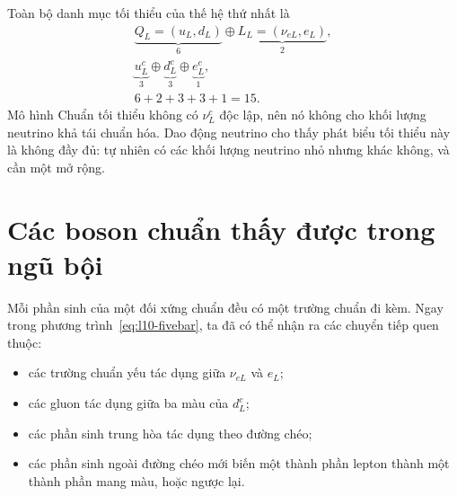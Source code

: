
Toàn bộ danh mục tối thiểu của thế hệ thứ nhất là
\begin{equation}
\begin{gathered}
\underbrace{Q_L=(u_L,d_L)}_{6}
\oplus
\underbrace{L_L=(\nu_{eL},e_L)}_{2},\\
\underbrace{u^c_L}_{3}
\oplus
\underbrace{d^c_L}_{3}
\oplus
\underbrace{e^c_L}_{1},\\
6+2+3+3+1=15.
\end{gathered}
\label{eq:l10-fifteen}
\end{equation}
Mô hình Chuẩn tối thiểu không có \(\nu^c_L\) độc lập, nên nó không cho khối lượng neutrino khả tái chuẩn hóa. Dao động neutrino cho thấy phát biểu tối thiểu này là không đầy đủ: tự nhiên có các khối lượng neutrino nhỏ nhưng khác không, và cần một mở rộng.

\begin{classroomqa}
\end{classroomqa}

\section{Các boson chuẩn thấy được trong ngũ bội}

Mỗi phần sinh của một đối xứng chuẩn đều có một trường chuẩn đi kèm. Ngay trong phương trình~\eqref{eq:l10-fivebar}, ta đã có thể nhận ra các chuyển tiếp quen thuộc:
\begin{itemize}
\item các trường chuẩn yếu tác dụng giữa \(\nu_{eL}\) và \(e_L\);
\item các gluon tác dụng giữa ba màu của \(d^c_L\);
\item các phần sinh trung hòa tác dụng theo đường chéo;
\item các phần sinh ngoài đường chéo mới biến một thành phần lepton thành một thành phần mang màu, hoặc ngược lại.
\end{itemize}

